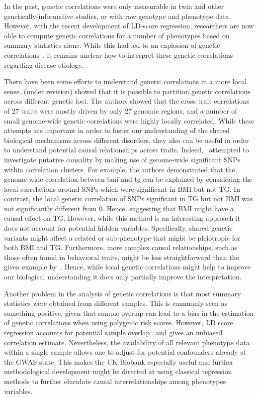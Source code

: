 In the past, genetic correlations were only measurable in twin and other genetically-informative studies, or with  raw genotype and phenotype data.
However, with the recent development of LD-score regression, researchers are now able to compute genetic correlations for     a number of phenotypes based on summary statistics alone.
While this had led to an explosion of genetic correlations~\cite{Bulik-Sullivan2015b,Bulik-Sullivan2015a}, it remains unclear how to interpret these genetic correlations regarding disease etiology.

There have been some efforts to understand genetic correlations in a more local sense.
\citet{Shi2016a} (under revision) showed that it is possible to partition genetic correlations across different genetic loci.
The authors showed that the cross trait correlations of 27 traits were mostly driven by only 27 genomic regions, and a number of small genome-wide genetic correlations were highly locally correlated.
While these attempts are important in order to foster our understanding of the shared biological mechanisms across different disorders, they also can be useful in order to understand potential causal relationships across traits.
Indeed,~\citet{Shi2016a} attempted to investigate putative causality by making use of genome-wide significant SNPs within correlation clusters.
For example, the authors demonstrated that the genome-wide correlation between \acrfull{bmi} and \acrfull{tg} can be explained by considering the local correlations around SNPs which were significant in BMI but not TG\@.
In contrast, the local genetic correlation of SNPs significant in TG  but not BMI was not significantly different from $0$.
Hence, suggesting that BMI might have a causal effect on TG\@.
However, while this method is an interesting approach it does not account for potential hidden variables.
Specifically, shared genetic variants might affect a related or sub-phenotype that might be pleiotropic for both BMI and TG\@.
Furthermore, more complex causal relationships, such as those often found in behavioral traits, might be less straightforward than the given example by~\citet{Shi2016a}.
Hence, while local genetic correlations might help to improve our biological understanding it does only partially improve the interpretation.

Another problem in the analysis of genetic correlations is that most summary statistics were obtained from different samples.
This is commonly seen as something positive, given that sample overlap can lead to a bias in the estimation of genetic correlations when using polygenic risk scores. 
However, LD score regression accounts for potential sample overlap~\cite{Bulik-Sullivan2015a} and gives an unbiased correlation estimate.  
Nevertheless, the availability of all relevant phenotype data within a single sample allows one to adjust for potential confounders already at the GWAS state.
This makes the UK Biobank especially useful and further methodological development might be directed at using classical regression methods to further elucidate causal interrelationships among phenotypes variables.


